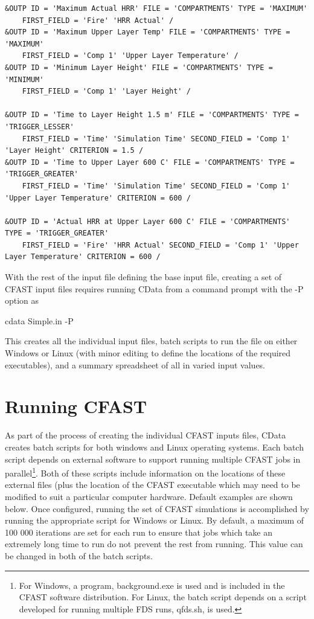 \documentclass[12pt,twoside]{book}
\begin{document}
\begin{lstlisting}[basicstyle=\scriptsize]
&OUTP ID = 'Maximum Actual HRR' FILE = 'COMPARTMENTS' TYPE = 'MAXIMUM'
    FIRST_FIELD = 'Fire' 'HRR Actual' /
&OUTP ID = 'Maximum Upper Layer Temp' FILE = 'COMPARTMENTS' TYPE = 'MAXIMUM'
    FIRST_FIELD = 'Comp 1' 'Upper Layer Temperature' /
&OUTP ID = 'Minimum Layer Height' FILE = 'COMPARTMENTS' TYPE = 'MINIMUM'
    FIRST_FIELD = 'Comp 1' 'Layer Height' /

&OUTP ID = 'Time to Layer Height 1.5 m' FILE = 'COMPARTMENTS' TYPE = 'TRIGGER_LESSER'
    FIRST_FIELD = 'Time' 'Simulation Time' SECOND_FIELD = 'Comp 1' 'Layer Height' CRITERION = 1.5 /
&OUTP ID = 'Time to Upper Layer 600 C' FILE = 'COMPARTMENTS' TYPE = 'TRIGGER_GREATER'
    FIRST_FIELD = 'Time' 'Simulation Time' SECOND_FIELD = 'Comp 1' 'Upper Layer Temperature' CRITERION = 600 /

&OUTP ID = 'Actual HRR at Upper Layer 600 C' FILE = 'COMPARTMENTS' TYPE = 'TRIGGER_GREATER'
    FIRST_FIELD = 'Fire' 'HRR Actual' SECOND_FIELD = 'Comp 1' 'Upper Layer Temperature' CRITERION = 600 /
\end{lstlisting}

With the rest of the input file defining the base input file, creating a set of CFAST input files requires running CData from a command prompt with the {\ct -P} option as

{\ct cdata Simple.in -P}

This creates all the individual input files, batch scripts to run the file on either Windows or Linux (with minor editing to define the locations of the required executables), and a summary spreadsheet of all in varied input values.

\section{Running CFAST}


As part of the process of creating the individual CFAST inputs files, CData creates batch scripts for both windows and Linux operating systems. Each batch script depends on external software to support running multiple CFAST jobs in parallel\footnote{For Windows, a program, {\ct background.exe} is used and is included in the CFAST software distribution. For Linux, the batch script depends on a script developed for running multiple FDS runs, {\ct qfds.sh}, is used.}. Both of these scripts include information on the locations of these external files (plus the location of the CFAST executable which may need to be modified to suit a particular computer hardware. Default examples are shown below. Once configured, running the set of CFAST simulations is accomplished by running the appropriate script for Windows or Linux. By default, a maximum of 100 000 iterations are set for each run to ensure that jobs which take an extremely long time to run do not prevent the rest from running.  This value can be changed in both of the batch scripts.
\end{document}
